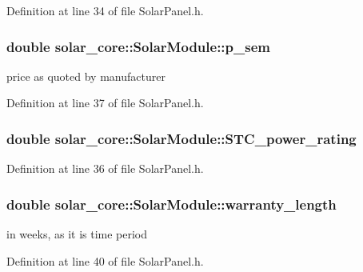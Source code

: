 Definition at line 34 of file Solar\+Panel.\+h.

\hypertarget{classsolar__core_1_1_solar_module_a34233be4549eb826fa5a4cc6a20993e3}{}
\subsubsection[{p\+\_\+sem}]{\setlength{\rightskip}{0pt plus 5cm}double solar\+\_\+core\+::\+Solar\+Module\+::p\+\_\+sem}\label{classsolar__core_1_1_solar_module_a34233be4549eb826fa5a4cc6a20993e3}
price as quoted by manufacturer 

Definition at line 37 of file Solar\+Panel.\+h.

\hypertarget{classsolar__core_1_1_solar_module_ada72a54d3a914a88fd3942f1a09065c1}{}
\subsubsection[{S\+T\+C\+\_\+power\+\_\+rating}]{\setlength{\rightskip}{0pt plus 5cm}double solar\+\_\+core\+::\+Solar\+Module\+::\+S\+T\+C\+\_\+power\+\_\+rating}\label{classsolar__core_1_1_solar_module_ada72a54d3a914a88fd3942f1a09065c1}


Definition at line 36 of file Solar\+Panel.\+h.

\hypertarget{classsolar__core_1_1_solar_module_a88f461fc1142688294bf19ca02b7ec0d}{}
\subsubsection[{warranty\+\_\+length}]{\setlength{\rightskip}{0pt plus 5cm}double solar\+\_\+core\+::\+Solar\+Module\+::warranty\+\_\+length}\label{classsolar__core_1_1_solar_module_a88f461fc1142688294bf19ca02b7ec0d}
in weeks, as it is time period 

Definition at line 40 of file Solar\+Panel.\+h.

